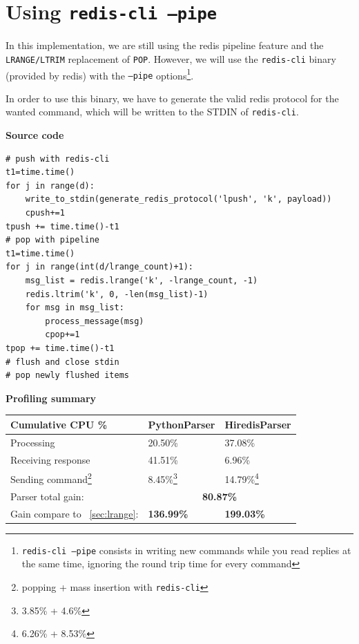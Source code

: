 \documentclass[a4paper, 11pt]{report}
\newcommand{\inlinecode}[1]{\colorbox{mybeige}{\ttfamily\texttt{#1}}}
\begin{document}
\newpage
\section{Using \texttt{redis-cli --pipe}\label{sec:cli}}
In this implementation, we are still using the redis pipeline feature and the \texttt{LRANGE/LTRIM} replacement of \texttt{POP}. However, we will use the \texttt{redis-cli} binary (provided by redis) with the \inlinecode{--pipe} options\footnote{\texttt{redis-cli --pipe} consists in writing new commands while you read replies at the same time, ignoring the round trip time for every command}.

In order to use this binary, we have to generate the valid redis protocol for the wanted command, which will be written to the STDIN of \texttt{redis-cli}.\\

\begin{minipage}[t]{0.45\textwidth}
\textbf{Source code}\\
\vspace{-0.5em}
\begin{lstlisting}
# push with redis-cli
t1=time.time()
for j in range(d):
    write_to_stdin(generate_redis_protocol('lpush', 'k', payload))
    cpush+=1
tpush += time.time()-t1
# pop with pipeline
t1=time.time()
for j in range(int(d/lrange_count)+1):
    msg_list = redis.lrange('k', -lrange_count, -1)
    redis.ltrim('k', 0, -len(msg_list)-1)
    for msg in msg_list:
        process_message(msg)
        cpop+=1
tpop += time.time()-t1
# flush and close stdin
# pop newly flushed items
\end{lstlisting}
\end{minipage}
\quad
\begin{minipage}[t]{0.5\textwidth}
\textbf{Profiling summary}\\

    \begin{tabular}{|l|l|l|}
        \hline
        Cumulative CPU \% & PythonParser & HiredisParser\\
        \hline
        Processing & 20.50\% & 37.08\%\\
        \hline
        Receiving response & 41.51\% & 6.96\%\\
        \hline
        Sending command\footnote{popping + mass insertion with \texttt{redis-cli}} & 8.45\%\footnote{3.85\% + 4.6\%} & 14.79\%\footnote{6.26\% + 8.53\%} \\
        \hline
        Parser total gain: & \multicolumn{2}{c|}{\textbf{80.87\%}}\\
        \hline
        Gain compare to ~\ref{sec:lrange}: & \textbf{136.99\%} & \textbf{199.03\%}\\
        \hline
    \end{tabular}
\end{minipage}
\end{document}
